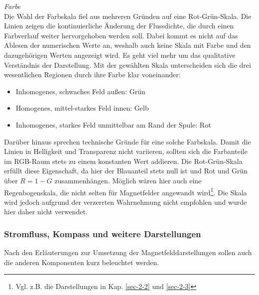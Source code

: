 \textit{Farbe}\\
Die Wahl der Farbskala fiel aus mehreren Gründen auf eine Rot-Grün-Skala. Die Linien zeigen die kontinuierliche Änderung der Flussdichte, die durch einen Farbverlauf weiter hervorgehoben werden soll. Dabei kommt es nicht auf das Ablesen der numerischen Werte an, weshalb auch keine Skala mit Farbe und den dazugehörigen Werten angezeigt wird. Es geht viel mehr um das qualitative Verständnis der Darstellung. Mit der gewählten Skala unterscheiden sich die drei wesentlichen Regionen durch ihre Farbe klar voneinander:
\begin{itemize}
	\setlength{\itemsep}{-1pt}
	\singlespacing
	\item Inhomogenes, schwaches Feld außen: Grün
	\item Homogenes, mittel-starkes Feld innen: Gelb
	\item Inhomogenes, starkes Feld unmittelbar am Rand der Spule: Rot
\end{itemize}

Darüber hinaus sprechen technische Gründe für eine solche Farbskala. Damit die Linien in Helligkeit und Transparenz nicht variieren, sollten sich die Farbanteile im RGB-Raum stets zu einem konstanten Wert addieren. Die Rot-Grün-Skala erfüllt diese Eigenschaft, da hier der Blauanteil stets null ist und Rot und Grün über $R = 1 - G$ zusammenhängen. Möglich wären hier auch eine Regenbogenskala, die nicht selten für Magnetfelder angewandt wird\footnote{Vgl. z.B. die Darstellungen in Kap. \ref{sec-2-2} und \ref{sec-2-3}}. Die Skala wird jedoch aufgrund der verzerrten Wahrnehmung nicht empfohlen und wurde hier daher nicht verwendet.

\subsubsection{Stromfluss, Kompass und weitere Darstellungen}
\label{sec-5-2-3}
Nach den Erläuterungen zur Umsetzung der Magnetfelddarstellungen sollen auch die anderen Komponenten kurz beleuchtet werden.\\

